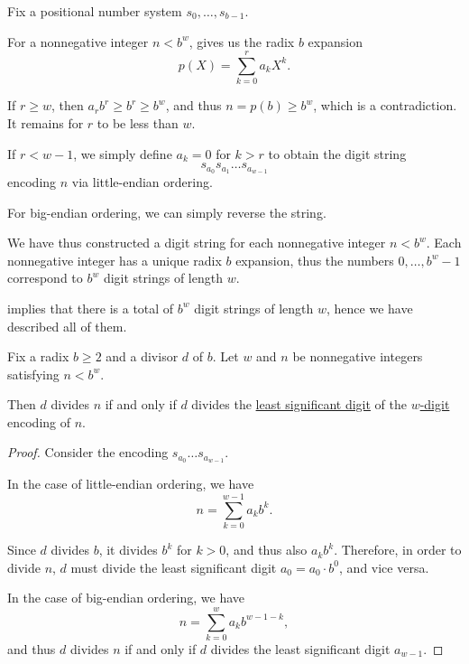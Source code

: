 \begin{defproof}
  Fix a positional number system \( s_0, \ldots, s_{b-1} \).

  For a nonnegative integer \( n < b^w \),  gives us the radix \( b \) expansion
  \begin{equation*}
    p(X) = \sum_{k=0}^r a_k X^k.
  \end{equation*}

  If \( r \geq w \), then \( a_r b^r \geq b^r \geq b^w \), and thus \( n = p(b) \geq b^w \), which is a contradiction. It remains for \( r \) to be less than \( w \).

  If \( r < w - 1 \), we simply define \( a_k = 0 \) for \( k > r \) to obtain the digit string
  \begin{equation*}
    s_{a_0} s_{a_1} \ldots s_{a_{w-1}}
  \end{equation*}
  encoding \( n \) via little-endian ordering.

  For big-endian ordering, we can simply reverse the string.

  We have thus constructed a digit string for each nonnegative integer \( n < b^w \). Each nonnegative integer has a unique radix \( b \) expansion, thus the numbers \( 0, \ldots, b^w - 1 \) correspond to \( b^w \) digit strings of length \( w \).

   implies that there is a total of \( b^w \) digit strings of length \( w \), hence we have described all of them.
\end{defproof}

\begin{proposition}\label{thm:nonnegative_integer_expansion_divisibility}
  Fix a radix \( b \geq 2 \) and a divisor \( d \) of \( b \). Let \( w \) and \( n \) be nonnegative integers satisfying \( n < b^w \).

  Then \( d \) divides \( n \) if and only if \( d \) divides the \hyperref[def:endianness]{least significant digit} of the \hyperref[def:fixed_width_nonnegative_integer_encoding]{\( w \)-digit} encoding of \( n \).
\end{proposition}
\begin{proof}
  Consider the encoding \( s_{a_0} \ldots s_{a_{w-1}} \).

  In the case of little-endian ordering, we have
  \begin{equation*}
    n = \sum_{k=0}^{w-1} a_k b^k.
  \end{equation*}

  Since \( d \) divides \( b \), it divides \( b^k \) for \( k > 0 \), and thus also \( a_k b^k \). Therefore, in order to divide \( n \), \( d \) must divide the least significant digit \( a_0 = a_0 \cdot b^0 \), and vice versa.

  In the case of big-endian ordering, we have
  \begin{equation*}
    n = \sum_{k=0}^w a_k b^{w-1-k},
  \end{equation*}
  and thus \( d \) divides \( n \) if and only if \( d \) divides the least significant digit \( a_{w-1} \).
\end{proof}

